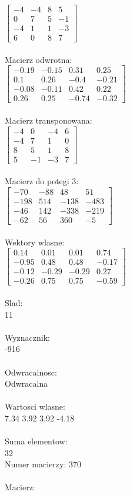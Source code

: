 \documentclass[a4paper,12pt]{article}
\begin{document}
$\begin{bmatrix} -4&-4&8&5\\0&7&5&-1\\-4&1&1&-3\\6&0&8&7 \end{bmatrix}$
\\
\\
Macierz odwrotna:\\

$\begin{bmatrix} -0.19&-0.15&0.31&0.25\\0.1&0.26&-0.4&-0.21\\-0.08&-0.11&0.42&0.22\\0.26&0.25&-0.74&-0.32 \end{bmatrix}$
\\
\\
Macierz transponowana:\\

$\begin{bmatrix} -4&0&-4&6\\-4&7&1&0\\8&5&1&8\\5&-1&-3&7 \end{bmatrix}$
\\
\\
Macierz do potegi 3:\\

$\begin{bmatrix} -70&-88&48&51\\-198&514&-138&-483\\-46&142&-338&-219\\-62&56&360&-5 \end{bmatrix}$
\\
\\
Wektory wlasne:\\

$\begin{bmatrix} 0.14&0.01&0.01&0.74\\-0.95&0.48&0.48&-0.17\\-0.12&-0.29&-0.29&0.27\\-0.26&0.75&0.75&-0.59 \end{bmatrix}$
\\
\\
Slad:\\
11
\\
\\
Wyznacznik:\\
-916
\\
\\
Odwracalnosc:\\
Odwracalna
\\
\\
Wartosci wlasne:\\
7.34 3.92 3.92 -4.18
\\
\\
Suma elementow:\\
32
\\
\newpage
Numer macierzy:
370
\\
\\
Macierz:\\
\end{document}
